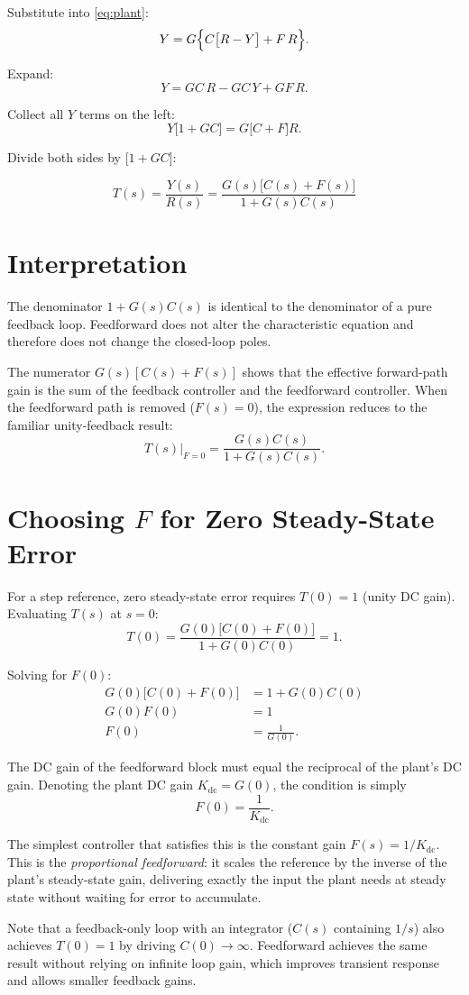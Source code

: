 \documentclass[11pt]{article}
\begin{document}
Substitute into \eqref{eq:plant}:
\[
  Y = G\Bigl\{C\bigl[R-Y\bigr] + F\,R\Bigr\}.
\]

Expand:
\[
  Y = GC\,R - GC\,Y + GF\,R.
\]

Collect all $Y$ terms on the left:
\[
  Y\bigl[1 + GC\bigr] = G\bigl[C + F\bigr]R.
\]

Divide both sides by $\bigl[1 + GC\bigr]$:

\[
  \boxed{T(s) = \frac{Y(s)}{R(s)} = \frac{G(s)\bigl[C(s)+F(s)\bigr]}{1+G(s)C(s)}}
\]

\section*{Interpretation}

The denominator $1 + G(s)C(s)$ is identical to the denominator of a pure
feedback loop.  Feedforward does not alter the characteristic equation and
therefore does not change the closed-loop poles.

The numerator $G(s)[C(s)+F(s)]$ shows that the effective forward-path gain is
the sum of the feedback controller and the feedforward controller.  When the
feedforward path is removed ($F(s)=0$), the expression reduces to the familiar
unity-feedback result:
\[
  T(s)\big|_{F=0} = \frac{G(s)C(s)}{1+G(s)C(s)}.
\]

\section*{Choosing $F$ for Zero Steady-State Error}

For a step reference, zero steady-state error requires $T(0) = 1$ (unity DC
gain).  Evaluating $T(s)$ at $s=0$:
\[
  T(0) = \frac{G(0)\bigl[C(0)+F(0)\bigr]}{1+G(0)C(0)} = 1.
\]

Solving for $F(0)$:
\begin{align*}
  G(0)\bigl[C(0)+F(0)\bigr] &= 1 + G(0)C(0) \\
  G(0)F(0)                  &= 1             \\
  F(0)                      &= \frac{1}{G(0)}.
\end{align*}

The DC gain of the feedforward block must equal the reciprocal of the plant's
DC gain.  Denoting the plant DC gain $K_{\mathrm{dc}} = G(0)$, the condition is simply
\[
  \boxed{F(0) = \frac{1}{K_{\mathrm{dc}}}.}
\]

The simplest controller that satisfies this is the constant gain $F(s) = 1/K_{\mathrm{dc}}$.
This is the \emph{proportional feedforward}: it scales the reference by the
inverse of the plant's steady-state gain, delivering exactly the input the
plant needs at steady state without waiting for error to accumulate.

Note that a feedback-only loop with an integrator ($C(s)$ containing $1/s$)
also achieves $T(0)=1$ by driving $C(0)\to\infty$.  Feedforward achieves the
same result without relying on infinite loop gain, which improves transient
response and allows smaller feedback gains.
\end{document}
